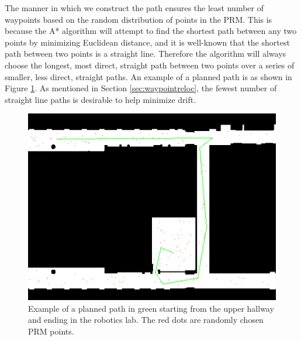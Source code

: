\documentclass[12pt]{article}
\begin{document}
The manner in which we construct the path ensures the least number of waypoints based on the random distribution of points in the PRM. This is because the A* algorithm will attempt to find the shortest path between any two points by minimizing Euclidean distance, and it is well-known that the shortest path between two points is a straight line. Therefore the algorithm will always choose the longest, most direct, straight path between two points over a series of smaller, less direct, straight paths. An example of a planned path is as shown in Figure \ref{fig:expath}. As mentioned in Section \ref{sec:waypointreloc}, the fewest number of straight line paths is desirable to help minimize drift.

\begin{figure}[H]
\centering
\includegraphics[scale=.4]{img/expath.jpg}
\caption{Example of a planned path in green starting from the upper hallway and ending in the robotics lab. The red dots are randomly chosen PRM points.}
\label{fig:expath}
\end{figure}
\end{document}
